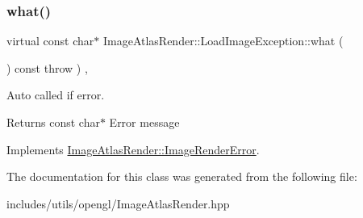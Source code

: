 \subsubsection{\texorpdfstring{what()}{what()}}
{\footnotesize\ttfamily virtual const char$\ast$ Image\+Atlas\+Render\+::\+Load\+Image\+Exception\+::what (\begin{DoxyParamCaption}{ }\end{DoxyParamCaption}) const throw  ) \hspace{0.3cm}{\ttfamily [inline]}, {\ttfamily [virtual]}}



Auto called if error. 

\begin{DoxyReturn}{Returns}
const char$\ast$ Error message 
\end{DoxyReturn}


Implements \hyperlink{class_image_atlas_render_1_1_image_render_error_a62f22cbcb2c3375a5c03de9f60af2bc0}{Image\+Atlas\+Render\+::\+Image\+Render\+Error}.



The documentation for this class was generated from the following file\+:\begin{DoxyCompactItemize}
\item 
includes/utils/opengl/Image\+Atlas\+Render.\+hpp\end{DoxyCompactItemize}
